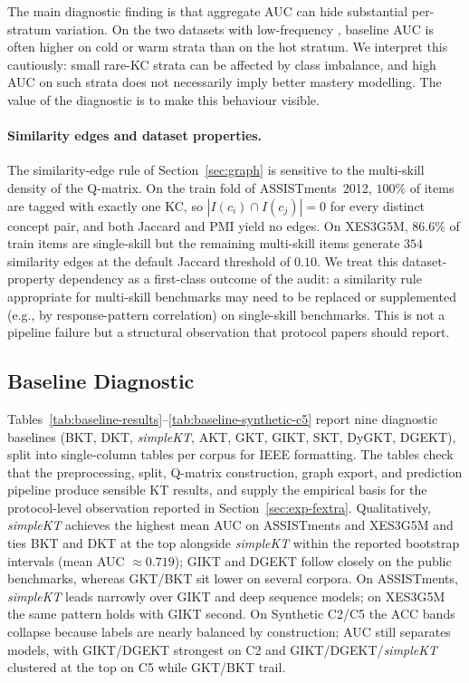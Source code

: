 The main diagnostic finding is that aggregate AUC can hide substantial
per-stratum variation. On the two datasets with low-frequency \KCs{},
baseline AUC is often higher on cold or warm strata than on the hot
stratum. We interpret this cautiously: small rare-KC strata can be
affected by class imbalance, and high AUC on such strata does not
necessarily imply better mastery modelling. The value of the diagnostic
is to make this behaviour visible.

\paragraph{Similarity edges and dataset properties.}
The similarity-edge rule of Section~\ref{sec:graph} is sensitive to the
multi-skill density of the Q-matrix. On the train fold of
ASSISTments~2012, $100\%$ of items are tagged with exactly one KC, so
$|I(c_i) \cap I(c_j)| = 0$ for every distinct concept pair, and both
Jaccard and PMI yield no edges. On XES3G5M, $86.6\%$ of train items are
single-skill but the remaining multi-skill items generate $354$
similarity edges at the default Jaccard threshold of $0.10$. We treat
this dataset-property dependency as a first-class outcome of the audit:
a similarity rule appropriate for multi-skill benchmarks may need to be
replaced or supplemented (e.g., by response-pattern correlation) on
single-skill benchmarks. This is not a pipeline failure but a structural
observation that protocol papers should report.
\subsection{Baseline Diagnostic}
\label{sec:exp-baseline}

Tables~\ref{tab:baseline-results}--\ref{tab:baseline-synthetic-c5} report nine diagnostic baselines
(BKT, DKT, \textit{simpleKT}, AKT, GKT, GIKT, SKT, DyGKT, DGEKT), split into single-column tables per corpus for IEEE formatting.
The tables check
that the preprocessing, split, Q-matrix construction, graph export, and
prediction pipeline produce sensible KT results, and supply the empirical
basis for the protocol-level observation reported in
Section~\ref{sec:exp-fextra}. Qualitatively, \textit{simpleKT} achieves the highest mean AUC on ASSISTments and
XES3G5M and ties BKT and DKT at the top alongside \textit{simpleKT} within the reported bootstrap
intervals (mean AUC ${\approx}0.719$); GIKT and DGEKT follow closely on the public benchmarks, whereas GKT/BKT sit lower on several corpora.
On ASSISTments, \textit{simpleKT} leads narrowly over GIKT and deep sequence models; on XES3G5M the same pattern holds with GIKT second.
On Synthetic C2/C5 the ACC bands collapse because labels are nearly balanced by construction; AUC still separates models, with GIKT/DGEKT strongest on C2 and GIKT/DGEKT/\textit{simpleKT} clustered at the top on C5 while GKT/BKT trail.

